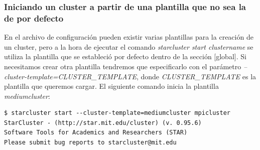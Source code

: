 \documentclass{article}
\begin{document}
\subsubsection{Iniciando un cluster a partir de una plantilla que no sea la de por defecto}
	En el archivo de configuración pueden existir varias plantillas para la creación de un cluster, pero a la hora de ejecutar el comando \emph{starcluster start clustername} se utiliza la plantilla que se estableció por defecto dentro de la sección [global]. Si necesitamos crear otra plantilla tendremos que especificarlo  con el parámetro \emph{--cluster-template=CLUSTER\_TEMPLATE}, donde \emph{CLUSTER\_TEMPLATE} es la plantilla que queremos cargar. El siguiente comando inicia la plantilla \emph{mediumcluster}:
\begin{lstlisting}[style=miniBash]
$ starcluster start --cluster-template=mediumcluster mpicluster
StarCluster - (http://star.mit.edu/cluster) (v. 0.95.6)
Software Tools for Academics and Researchers (STAR)
Please submit bug reports to starcluster@mit.edu


\end{lstlisting}
\end{document}
